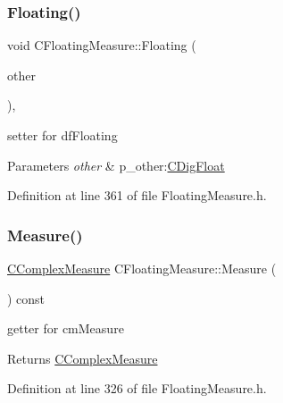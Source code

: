 \subsubsection{\texorpdfstring{Floating()}{Floating()}\hspace{0.1cm}{\footnotesize\ttfamily [2/2]}}
{\footnotesize\ttfamily void C\+Floating\+Measure\+::\+Floating (\begin{DoxyParamCaption}\item[{const \hyperlink{classCDigFloat}{C\+Dig\+Float} \&}]{other }\end{DoxyParamCaption})\hspace{0.3cm}{\ttfamily [inline]}, {\ttfamily [protected]}}



setter for df\+Floating 


\begin{DoxyParams}{Parameters}
{\em other} & p\+\_\+other\+:\hyperlink{classCDigFloat}{C\+Dig\+Float} \\
\hline
\end{DoxyParams}


Definition at line 361 of file Floating\+Measure.\+h.

\mbox{\label{classCFloatingMeasure_a8ac3af95a2619670a51d744c85b44463}} 
\subsubsection{\texorpdfstring{Measure()}{Measure()}\hspace{0.1cm}{\footnotesize\ttfamily [1/2]}}
{\footnotesize\ttfamily \hyperlink{classCComplexMeasure}{C\+Complex\+Measure} C\+Floating\+Measure\+::\+Measure (\begin{DoxyParamCaption}{ }\end{DoxyParamCaption}) const\hspace{0.3cm}{\ttfamily [inline]}}



getter for cm\+Measure 

\begin{DoxyReturn}{Returns}
\hyperlink{classCComplexMeasure}{C\+Complex\+Measure} 
\end{DoxyReturn}


Definition at line 326 of file Floating\+Measure.\+h.



